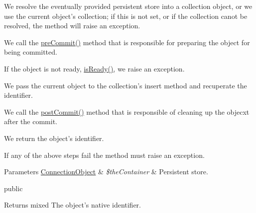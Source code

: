 \begin{DoxyItemize}
\item We resolve the eventually provided persistent store into a collection object, or we use the current object's collection; if this is not set, or if the collection canot be resolved, the method will raise an exception. 
\item We call the {\ttfamily \hyperlink{namespace_ontology_wrapper_a5980c6068634a59d6fbd56e0767d111b}{pre\-Commit()}} method that is responsible for preparing the object for being committed. 
\item If the object is not ready, \hyperlink{namespace_ontology_wrapper_a54350c9fd625965326da65246d145282}{is\-Ready()}, we raise an exception. 
\item We pass the current object to the collection's insert method and recuperate the identifier. 
\item We call the {\ttfamily \hyperlink{namespace_ontology_wrapper_a402131d10c18417ee42fd66589796fdf}{post\-Commit()}} method that is responsible of cleaning up the objecxt after the commit. 
\item We return the object's identifier. 
\end{DoxyItemize}

If any of the above steps fail the method must raise an exception.


\begin{DoxyParams}[1]{Parameters}
\hyperlink{class_ontology_wrapper_1_1_connection_object}{Connection\-Object} & {\em \$the\-Container} & Persistent store.\\
\hline
\end{DoxyParams}
public \begin{DoxyReturn}{Returns}
mixed The object's native identifier.
\end{DoxyReturn}

